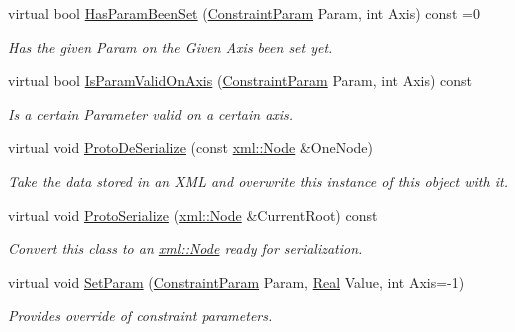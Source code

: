 \begin{DoxyCompactItemize}
virtual bool \hyperlink{classphys_1_1TypedConstraint_a849e7b91306f444cb8c73d52707a9521}{HasParamBeenSet} (\hyperlink{namespacephys_aa1e7cf2d7efcaeaeac304f711e7564e8}{ConstraintParam} Param, int Axis) const =0
\begin{DoxyCompactList}\small\item\em Has the given Param on the Given Axis been set yet. \item\end{DoxyCompactList}\item 
virtual bool \hyperlink{classphys_1_1TypedConstraint_a57f6e5053357deb43dae26a85b050207}{IsParamValidOnAxis} (\hyperlink{namespacephys_aa1e7cf2d7efcaeaeac304f711e7564e8}{ConstraintParam} Param, int Axis) const 
\begin{DoxyCompactList}\small\item\em Is a certain Parameter valid on a certain axis. \item\end{DoxyCompactList}\item 
virtual void \hyperlink{classphys_1_1TypedConstraint_aeafb306788de02bfb164806054a1c346}{ProtoDeSerialize} (const \hyperlink{classphys_1_1xml_1_1Node}{xml::Node} \&OneNode)
\begin{DoxyCompactList}\small\item\em Take the data stored in an XML and overwrite this instance of this object with it. \item\end{DoxyCompactList}\item 
virtual void \hyperlink{classphys_1_1TypedConstraint_a9cf48a2a1afb939cbd03e54ee9be3e0b}{ProtoSerialize} (\hyperlink{classphys_1_1xml_1_1Node}{xml::Node} \&CurrentRoot) const 
\begin{DoxyCompactList}\small\item\em Convert this class to an \hyperlink{classphys_1_1xml_1_1Node}{xml::Node} ready for serialization. \item\end{DoxyCompactList}\item 
virtual void \hyperlink{classphys_1_1TypedConstraint_adc1375a6adb954adb28615ff7c4cec4e}{SetParam} (\hyperlink{namespacephys_aa1e7cf2d7efcaeaeac304f711e7564e8}{ConstraintParam} Param, \hyperlink{namespacephys_af7eb897198d265b8e868f45240230d5f}{Real} Value, int Axis=-\/1)
\begin{DoxyCompactList}\small\item\em Provides override of constraint parameters. \item\end{DoxyCompactList}\item 

\end{DoxyCompactItemize}
